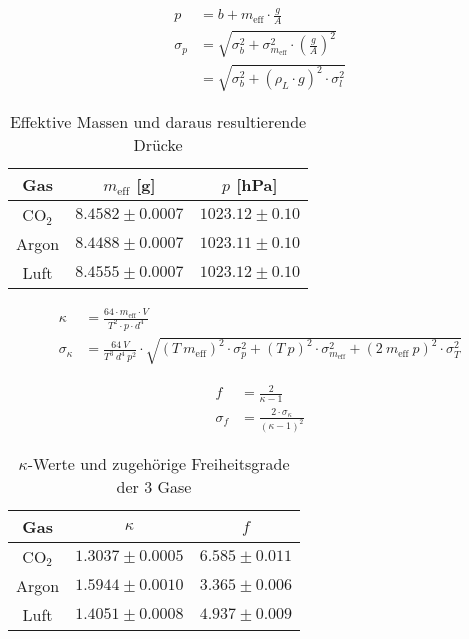 \documentclass[12pt,a4paper,titlepage,headinclude,bibtotoc]{scrartcl}
\begin{document}
\begin{align}
	p &= b + m_{\text{eff}} \cdot \frac{g}{A}\\
	\sigma_p &= \sqrt{\sigma_b^2+\sigma_{m_{\text{eff}}}^2 \cdot \left(\frac{g}{A}\right)^2}\\
	&=\sqrt{\sigma_b^2+\left(\rho_L \cdot g\right)^2 \cdot \sigma_l^2 }
\end{align}

\begin{table}[!hbt]
	\centering
	\begin{tabular}{|c|c|c|}
		\hline
		Gas & $m_{\text{eff}}$ [g] & $p$ [hPa] \\
		\hline
		\hline
		CO$_2$ & $8.4582 \pm 0.0007$ & $1023.12 \pm 0.10$ \\
		Argon & $8.4488 \pm 0.0007$ & $1023.11 \pm 0.10$ \\
		Luft & $8.4555 \pm 0.0007$ & $1023.12 \pm 0.10$ \\
		\hline
	\end{tabular}
	\caption{Effektive Massen und daraus resultierende Drücke}
	\label{tab:RuechardtMasseDruck}
\end{table}


\begin{align}
	\kappa&=\frac{64 \cdot m_{\text{eff}}\cdot V }{T^{2} \cdot p \cdot d^{4}}\\
	\sigma_{\kappa}&=\frac{64 ~ V}{T^{3} ~ d^{4} ~ p^{2}} \cdot \sqrt{\left(T ~ m_{\text{eff}}\right)^2 \cdot \sigma_{p}^{2} + \left(T ~ p\right)^2 \cdot \sigma_{m_{\text{eff}}}^{2} + \left(2~m_{\text{eff}}~p\right)^{2} \cdot \sigma_{T}^{2}}
\end{align}

\begin{align}
	f&=\frac{2}{\kappa - 1}\\
	\sigma_{f}&=\frac{2 \cdot \sigma_{\kappa}}{\left(\kappa - 1\right)^{2}}
\end{align}

\begin{table}[!hbt]
	\centering
	\begin{tabular}{|c|c|c|}
		\hline
		Gas & $\kappa$ & $f$\\
		\hline
		\hline		
		CO$_2$ & $1.3037 \pm 0.0005$ & $6.585 \pm 0.011$ \\
		Argon & $1.5944 \pm 0.0010$ & $3.365 \pm 0.006$ \\
		Luft & $1.4051 \pm 0.0008$ & $4.937 \pm 0.009$ \\		
		\hline
	\end{tabular}
	\caption{$\kappa$-Werte und zugehörige Freiheitsgrade der 3 Gase}
	\label{tab:RuechardtKappaF}
\end{table}
\end{document}
